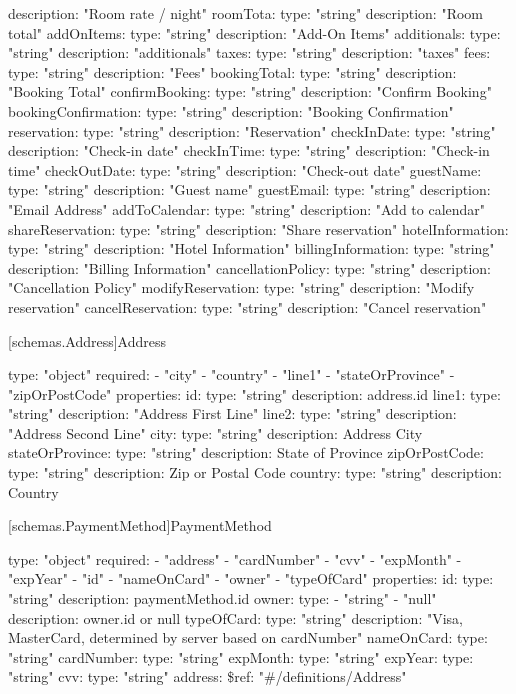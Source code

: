 \begin{codeblock}
      description: "Room rate / night"
    roomTota:
      type: "string"
      description: "Room total"
    addOnItems:
      type: "string"
      description: "Add-On Items"
    additionals:
      type: "string"
      description: "additionals"
    taxes:
      type: "string"
      description: "taxes"
    fees:
      type: "string"
      description: "Fees"
    bookingTotal:
      type: "string"
      description: "Booking Total"
    confirmBooking:
      type: "string"
      description: "Confirm Booking"
    bookingConfirmation:
      type: "string"
      description: "Booking Confirmation"
    reservation:
      type: "string"
      description: "Reservation"
    checkInDate:
      type: "string"
      description: "Check-in date"
    checkInTime:
      type: "string"
      description: "Check-in time"
    checkOutDate:
      type: "string"
      description: "Check-out date"
    guestName:
      type: "string"
      description: "Guest name"
    guestEmail:
      type: "string"
      description: "Email Address"
    addToCalendar:
      type: "string"
      description: "Add to calendar"
    shareReservation:
      type: "string"
      description: "Share reservation"
    hotelInformation:
      type: "string"
      description: "Hotel Information"
    billingInformation:
      type: "string"
      description: "Billing Information"
    cancellationPolicy:
      type: "string"
      description: "Cancellation Policy"
    modifyReservation:
      type: "string"
      description: "Modify reservation"
    cancelReservation:
      type: "string"
      description: "Cancel reservation"
\end{codeblock}

[schemas.Address]{Address}
\begin{codeblock}
  type: "object"
  required:
  - "city"
  - "country"
  - "line1"
  - "stateOrProvince"
  - "zipOrPostCode"
  properties:
    id:
      type: "string"
      description: address.id
    line1:
      type: "string"
      description: "Address First Line"
    line2:
      type: "string"
      description: "Address Second Line"
    city:
      type: "string"
      description: Address City
    stateOrProvince: 
      type: "string"
      description: State of Province
    zipOrPostCode:
      type: "string"
      description: Zip or Postal Code
    country:
      type: "string"
      description: Country
\end{codeblock}

[schemas.PaymentMethod]{PaymentMethod}
\begin{codeblock}
  type: "object"
  required:
  - "address"
  - "cardNumber"
  - "cvv"
  - "expMonth"
  - "expYear"
  - "id"
  - "nameOnCard"
  - "owner"
  - "typeOfCard"
  properties:
    id:
      type: "string"
      description: paymentMethod.id
    owner:
      type: 
      - "string"
      - "null"
      description: owner.id or null
    typeOfCard:
      type: "string"
      description: "Visa, MasterCard, determined by server based on cardNumber"
    nameOnCard:
      type: "string"
    cardNumber:
      type: "string"
    expMonth:
      type: "string"
    expYear:
      type: "string"
    cvv:
      type: "string"
    address:
      \$ref: "#/definitions/Address"
\end{codeblock}

